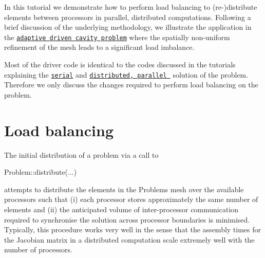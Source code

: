 In this tutorial we demonstrate how to perform load balancing to (re-\/)distribute elements between processors in parallel, distributed computations. Following a brief discussion of the underlying methodology, we illustrate the application in the \href{../../../navier_stokes/adaptive_driven_cavity/html/index.html}{\tt adaptive driven cavity problem} where the spatially non-\/uniform refinement of the mesh leads to a significant load imbalance.

Most of the driver code is identical to the codes discussed in the tutorials explaining the \href{../../../navier_stokes/adaptive_driven_cavity/html/index.html}{\tt serial} and \href{../../adaptive_driven_cavity/html/index.html}{\tt distributed, parallel } solution of the problem. Therefore we only discuss the changes required to perform load balancing on the problem.



\hypertarget{index_load_balance}{}\section{Load balancing}\label{index_load_balance}
The initial distribution of a problem via a call to 
\begin{DoxyCode}
Problem::distribute(...)
\end{DoxyCode}
 attempts to distribute the elements in the Problem\textquotesingle{}s mesh over the available processors such that (i) each processor stores approximately the same number of elements and (ii) the anticipated volume of inter-\/processor communication required to synchronise the solution across processor boundaries is minimised. Typically, this procedure works very well in the sense that the assembly times for the Jacobian matrix in a distributed computation scale extremely well with the number of processors.

